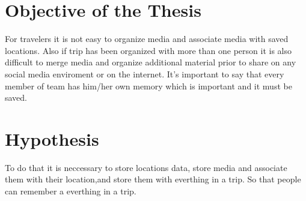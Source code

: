 \section{Objective of the Thesis}
For travelers it is not easy to organize media and associate media with saved locations. Also if trip has been organized with more than one person it is also difficult to merge media and organize additional material prior to share on any social media enviroment or on the internet. It's important to say that every member of team has him/her own memory which is important and it must be saved.

\section{Hypothesis}
To do that it is neccessary to store locations data, store media and associate them with their location,and store them with everthing in a trip. So that people can remember a everthing in a trip.